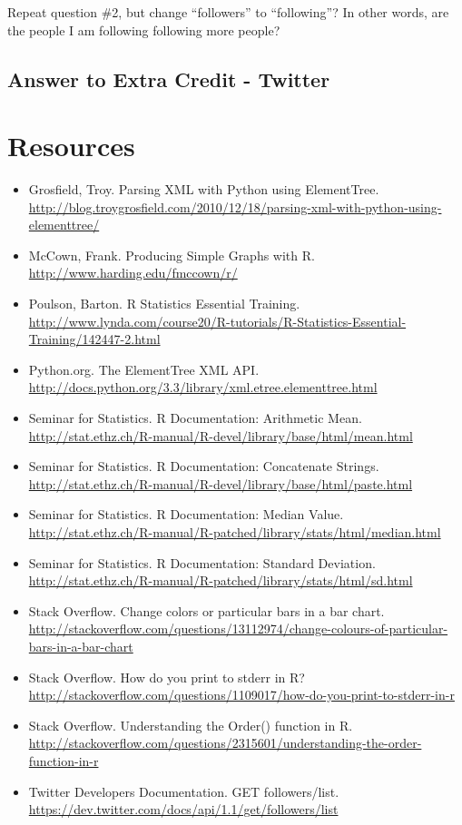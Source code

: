 \documentclass{article}
\begin{document}
Repeat question \#2, but change ``followers'' to ``following''? In other words, are the people I am following following more people?

\subsection*{Answer to Extra Credit - Twitter}

\clearpage

\section*{Resources}

\begin{itemize}
\item Grosfield, Troy. Parsing XML with Python using ElementTree. \url{http://blog.troygrosfield.com/2010/12/18/parsing-xml-with-python-using-elementtree/}
\item McCown, Frank. Producing Simple Graphs with R. \url{http://www.harding.edu/fmccown/r/}
\item Poulson, Barton. R Statistics Essential Training. \url{http://www.lynda.com/course20/R-tutorials/R-Statistics-Essential-Training/142447-2.html}
\item Python.org. The ElementTree XML API. \url{http://docs.python.org/3.3/library/xml.etree.elementtree.html}
\item Seminar for Statistics. R Documentation: Arithmetic Mean. \url{http://stat.ethz.ch/R-manual/R-devel/library/base/html/mean.html}
\item Seminar for Statistics. R Documentation: Concatenate Strings. \url{http://stat.ethz.ch/R-manual/R-devel/library/base/html/paste.html}
\item Seminar for Statistics. R Documentation: Median Value. \url{http://stat.ethz.ch/R-manual/R-patched/library/stats/html/median.html}
\item Seminar for Statistics. R Documentation: Standard Deviation. \url{http://stat.ethz.ch/R-manual/R-patched/library/stats/html/sd.html}
\item Stack Overflow. Change colors or particular bars in a bar chart. \url{http://stackoverflow.com/questions/13112974/change-colours-of-particular-bars-in-a-bar-chart}
\item Stack Overflow. How do you print to stderr in R? \url{http://stackoverflow.com/questions/1109017/how-do-you-print-to-stderr-in-r}
\item Stack Overflow. Understanding the Order() function in R. \url{http://stackoverflow.com/questions/2315601/understanding-the-order-function-in-r}
\item Twitter Developers Documentation. GET followers/list. \url{https://dev.twitter.com/docs/api/1.1/get/followers/list}
\end{itemize}
\end{document}
